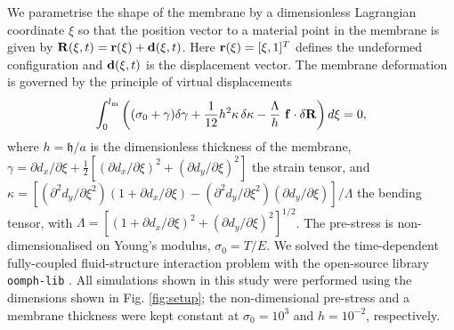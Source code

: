 \documentclass[aps,prl,reprint,superscriptaddress,floatfix]{revtex4-1}
\begin{document}
We parametrise the shape of the membrane by a dimensionless
Lagrangian coordinate $\xi$ so that the position vector
to a material point in the membrane is
given by ${\bf R}(\xi,t) = {\bf r}(\xi) + {\bf d}(\xi,t)$. Here ${\bf
  r}(\xi) = [\xi, 1]^T$ defines the undeformed configuration and $
{\bf d}(\xi,t)$ is the displacement vector. The membrane
deformation is governed by the principle of virtual displacements
\begin{equation}
\label{eq:virtualdisplacement}
\int_{0}^{l_\text{m}} \left((\sigma_0 + \gamma)\delta \gamma
+ \frac{1}{12}h^2\kappa \,\delta\kappa -
\frac{\Lambda}{h} \ {\bf f} \cdot \delta {\bf R} \right) d\xi = 0,
\end{equation}
where $h=\mathfrak{h}/a$ is the dimensionless thickness of the membrane,
$\gamma=\partial d_x/\partial {\xi} + \frac{1}{2}[(\partial d_x/\partial
  {\xi})^2 + (\partial d_y/\partial {\xi})^2]$ the strain tensor, and
$\kappa = [(\partial^2 d_y/\partial {\xi^2})(1+\partial d_x/\partial
  {\xi}) - (\partial^2 d_y/\partial {{\xi}^2}) (\partial d_y/\partial
  {\xi})]/\Lambda$ the bending tensor, with $\Lambda=[(1+\partial
  d_x/\partial \xi)^2+(\partial d_y/\partial {\xi})^2]^{1/2}$.
The pre-stress is non-dimensionalised on Young's modulus, $\sigma_0 = T/E$. 
We solved the time-dependent fully-coupled fluid-structure 
interaction problem with
the open-source library {\tt oomph-lib} \cite{OOmph,heil2006}.
All simulations shown in this study were performed using the
dimensions shown in Fig. \ref{fig:setup}; the non-dimensional pre-stress
and a membrane thickness were kept constant at $ \sigma_0 =10^3$ 
and $h=10^{-2}$, respectively.
\end{document}
